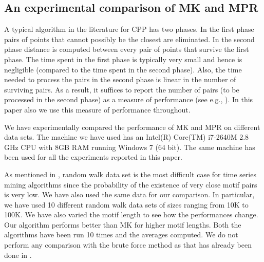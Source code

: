 \documentclass{article}
\theoremstyle{definition}
\theoremstyle{remark}
\begin{document}
\subsection{An experimental comparison of MK and MPR}
A typical algorithm in the literature for CPP has two phases. In the first phase pairs of points that cannot possibly be the closest are eliminated. In the second phase distance is computed between every pair of points that survive the first phase. The time spent in the first phase is typically very small and hence is negligible (compared to the time spent in the second phase). Also, the time needed to process the pairs in the second phase is linear in the number of surviving pairs. As a result, it suffices to report the number of pairs (to be processed in the second phase) as a measure of performance (see e.g., \cite{PBK11}). In this paper also we use this measure of performance throughout.

We have experimentally compared the performance of MK and MPR on different data sets. The machine we have used has an
Intel(R) Core(TM) i7-2640M 2.8 GHz CPU with 8GB RAM running Windows 7 (64 bit). The same machine has been used for all the experiments reported in this paper.

As mentioned in \cite{AEQSB09}, random walk data set is the most difficult case for time series mining algorithms since the probability of the existence of very close motif pairs is very low.
We have also used the same data for our comparison.
In particular, we have used 10 different random walk data sets of sizes ranging from 10K to 100K. We have also varied the motif length to see how the performances change. Our algorithm performs better than MK for higher motif lengths. Both the algorithms have been run 10 times and the averages computed. We do not perform any comparison with the brute force  method as that has already been done in \cite{AEQSB09}.\newline
\end{document}
